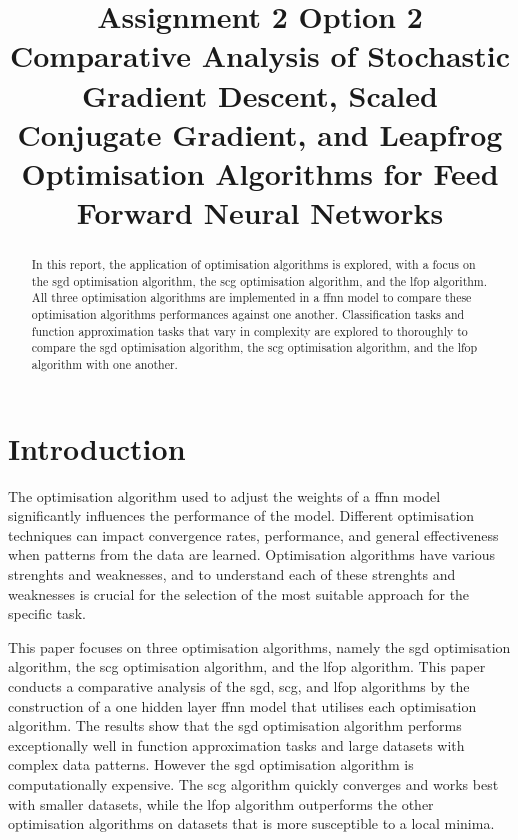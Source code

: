 \documentclass[10pt, conference]{IEEEtran}
\begin{document}
\title{Assignment 2 Option 2 \\
Comparative Analysis of Stochastic Gradient Descent, Scaled Conjugate Gradient,
and Leapfrog Optimisation Algorithms for Feed Forward Neural Networks
}

\author{
}

\maketitle

\begin{abstract}
In this report, the application of optimisation algorithms is explored, with a focus on the \acrfull{sgd}
optimisation algorithm, the \acrfull{scg} optimisation algorithm, and the \acrfull{lfop} algorithm.
All three optimisation algorithms are implemented in a \acrfull{ffnn} model to compare these
optimisation algorithms performances against one another. Classification tasks and function
approximation tasks that vary in complexity are explored to thoroughly to compare the
\acrshort{sgd} optimisation algorithm, the \acrshort{scg} optimisation algorithm, and
the \acrshort{lfop} algorithm with one another.
\end{abstract}

\section{Introduction}

The optimisation algorithm used to adjust the weights of a \acrfull{ffnn} model significantly influences the
performance of the model. Different optimisation techniques can impact convergence rates, performance, and
general effectiveness when patterns from the data are learned. Optimisation algorithms have various strenghts
and weaknesses, and to understand each of these strenghts and weaknesses is crucial for the selection of the most
suitable approach for the specific task.

This paper focuses on three optimisation algorithms, namely the \acrfull{sgd} optimisation algorithm, the
\acrfull{scg} optimisation algorithm, and the \acrfull{lfop} algorithm. This paper conducts a comparative analysis
of the \acrshort{sgd}, \acrshort{scg}, and \acrshort{lfop} algorithms by the construction of a one hidden layer
\acrshort{ffnn} model that utilises each optimisation algorithm. The results show that the \acrshort{sgd} optimisation
algorithm performs exceptionally well in function approximation tasks and large datasets with complex data patterns.
However the \acrshort{sgd} optimisation algorithm is computationally expensive. The \acrshort{scg} algorithm quickly
converges and works best with smaller datasets, while the \acrshort{lfop} algorithm outperforms the other optimisation algorithms on
datasets that is more susceptible to a local minima.
\end{document}
